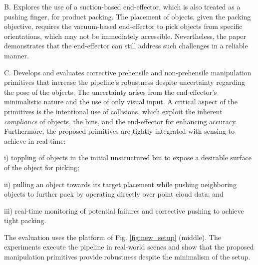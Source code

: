B. Explores the use of a suction-based end-effector, which is also treated as a pushing finger, for product packing. The placement of objects, given the packing objective, requires the vacuum-based end-effector to pick objects from specific orientations, which may not be immediately accessible. Nevertheless, the paper demonstrates that the end-effector can still address such challenges in a reliable manner.  

C. Develops and evaluates corrective prehensile and non-prehensile manipulation primitives that increase the pipeline's robustness despite uncertainty regarding the pose of the objects. The uncertainty arises from the end-effector's minimalistic nature and the use of only visual input.  A critical aspect of the primitives is the intentional use of collisions, which exploit the inherent \textit{compliance} of objects, the bins, and the end-effector for enhancing accuracy. Furthermore, the proposed primitives are tightly integrated with sensing to achieve in real-time: 

\begin{myitem}
\item[i)] toppling of objects in the initial unstructured bin to expose a desirable surface of the object for picking; 
\item[ii)] pulling an object towards its target placement while pushing neighboring objects to further pack by operating directly over point cloud data; and 
\item[iii)] real-time monitoring of potential failures and corrective pushing to achieve tight packing.
\end{myitem}

The  evaluation uses the platform of Fig. \ref{fig:new_setup} (middle). The experiments execute the pipeline in real-world scenes and show that the proposed manipulation primitives provide robustness despite the minimalism of the setup.







